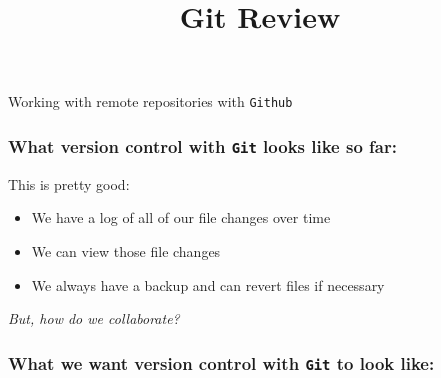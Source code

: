 \documentclass{beamer}
\title{Git Review}
\begin{document}
\begin{frame}
\begin{center}
Working with remote repositories with \texttt{Github}
\end{center}
\end{frame}

\begin{frame}
\frametitle{What version control with \texttt{Git} looks like so far:}
\begin{center}
\end{center}
This is pretty good:
\begin{itemize}
\item We have a log of all of our file changes  over time
\item We can view those file changes
\item We always have a backup and can revert files if necessary
\end{itemize}
\pause
\begin{center}
\textit{But, how do we collaborate?}
\end{center}
\end{frame}

\begin{frame}
\frametitle{What we want version control with \texttt{Git} to look like:}
\begin{center}
\end{center}
\end{frame}
\end{document}
